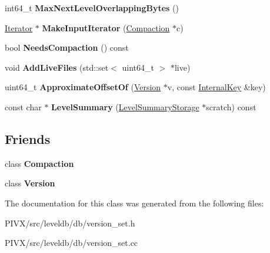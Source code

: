 \begin{DoxyCompactItemize}
\mbox{\label{classleveldb_1_1_version_set_a32dc1a7e1eaeeeac89286be3483ad612}} 
int64\+\_\+t {\bfseries Max\+Next\+Level\+Overlapping\+Bytes} ()
\item 
\mbox{\label{classleveldb_1_1_version_set_a181194e96a88e69a60c1fda9cf3c4651}} 
\mbox{\hyperlink{classleveldb_1_1_iterator}{Iterator}} $\ast$ {\bfseries Make\+Input\+Iterator} (\mbox{\hyperlink{classleveldb_1_1_compaction}{Compaction}} $\ast$c)
\item 
\mbox{\label{classleveldb_1_1_version_set_a5a8a8a80e14a141672c7fdc9c7dd7328}} 
bool {\bfseries Needs\+Compaction} () const
\item 
\mbox{\label{classleveldb_1_1_version_set_a3b3c810f0fea88db81b94e604b3dd78f}} 
void {\bfseries Add\+Live\+Files} (std\+::set$<$ uint64\+\_\+t $>$ $\ast$live)
\item 
\mbox{\label{classleveldb_1_1_version_set_ada7f3ed63b1c48adb6e5b38348b300e1}} 
uint64\+\_\+t {\bfseries Approximate\+Offset\+Of} (\mbox{\hyperlink{classleveldb_1_1_version}{Version}} $\ast$v, const \mbox{\hyperlink{classleveldb_1_1_internal_key}{Internal\+Key}} \&key)
\item 
\mbox{\label{classleveldb_1_1_version_set_a1c49a6a2f6c6346d19d57ade22e04ee2}} 
const char $\ast$ {\bfseries Level\+Summary} (\mbox{\hyperlink{structleveldb_1_1_version_set_1_1_level_summary_storage}{Level\+Summary\+Storage}} $\ast$scratch) const
\end{DoxyCompactItemize}
\subsection*{Friends}
\begin{DoxyCompactItemize}
\item 
\mbox{\label{classleveldb_1_1_version_set_a9372e882b35d27c78356228e4b758917}} 
class {\bfseries Compaction}
\item 
\mbox{\label{classleveldb_1_1_version_set_ace162f32d4abb584945d3a55a389b0a3}} 
class {\bfseries Version}
\end{DoxyCompactItemize}


The documentation for this class was generated from the following files\+:\begin{DoxyCompactItemize}
\item 
P\+I\+V\+X/src/leveldb/db/version\+\_\+set.\+h\item 
P\+I\+V\+X/src/leveldb/db/version\+\_\+set.\+cc\end{DoxyCompactItemize}
